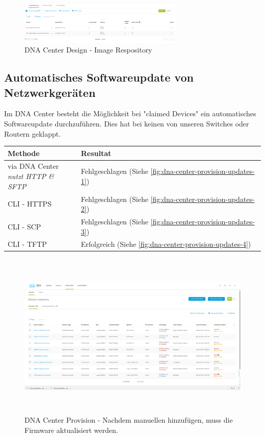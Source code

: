 \begin{figure}[H]
	\centering
	\includegraphics[height=2cm]{img/dna-center-design-image-repository.png}
	\caption{DNA Center Design - Image Respository}
	\label{fig:dna-center-design-image-repository}
\end{figure}

\subsection{Automatisches Softwareupdate von Netzwerkgeräten}

Im DNA Center besteht die Möglichkeit bei "claimed Devices" ein automatisches Softwareupdate durchzuführen. Dies hat bei keinen von unseren Switches oder Routern geklappt. 

\begin{tabular}{ | l | l |}
	\hline
	\textbf{Methode} & \textbf{Resultat} \\
	\hline	
	\makecell{via DNA Center \\ \textit{nutzt HTTP \& SFTP}} & Fehlgeschlagen (Siehe \ref{fig:dna-center-provision-updates-1}) \\
	CLI - HTTPS    & Fehlgeschlagen (Siehe \ref{fig:dna-center-provision-updates-2}) \\
	CLI - SCP      & Fehlgeschlagen (Siehe \ref{fig:dna-center-provision-updates-3}) \\
	CLI - TFTP     & Erfolgreich (Siehe \ref{fig:dna-center-provision-updates-4}) \\	
	\hline	
\end{tabular}

\begin{figure}[H]
	\centering
	\includegraphics[height=8cm]{img/updates/Selection_070.png}
	\caption{DNA Center Provision - Nachdem manuellen hinzufügen, muss die Firmware aktualisiert werden.}
	\label{fig:dna-center-provision-updates}
\end{figure}


